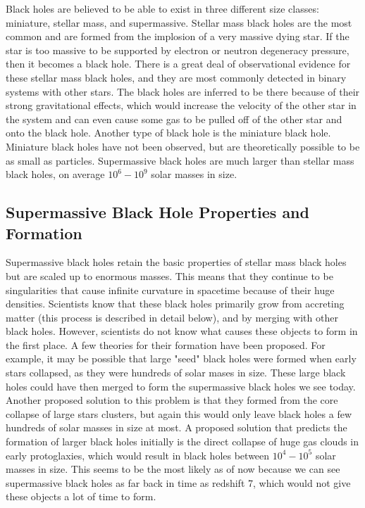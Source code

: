 \documentclass[12pt]{article}
\begin{document}
Black holes are believed to be able to exist in three different size classes:
miniature, stellar mass, and supermassive.  Stellar mass black holes are the
most common and are formed from the implosion of a very massive dying star.  If
the star is too massive to be supported by electron or neutron degeneracy
pressure, then it becomes a black hole.  There is a
great deal of observational evidence for these stellar mass black holes, and
they are most commonly detected in binary systems with other stars.  The black
holes are inferred to be there because of their strong gravitational effects,
which would increase the velocity of the other star in the system and can even
cause some gas to be pulled off of the other star and onto the black hole.
Another type of black hole is the miniature black hole.  Miniature
black holes have not been observed, but are theoretically possible to be as
small as particles.  Supermassive black holes are much larger than stellar mass
black holes, on average $10^6 -10^9$ solar masses in size.

\subsection{Supermassive Black Hole Properties and Formation}
Supermassive black holes retain the basic properties of stellar mass black holes
but are scaled up to enormous masses.  This means that they continue to be
singularities that cause infinite curvature in spacetime because of their huge
densities.  Scientists know that these black holes primarily grow from accreting
matter (this process is described in detail below), and by merging with other
black holes.  However, scientists do not know what causes these objects to form
in the first place.  A few theories for their formation have been proposed.  For
example, it may be possible that large "seed" black holes were formed when early
stars collapsed, as they were hundreds of solar mases in size.  These large
black holes could have then merged to form the supermassive black holes we see
today.  Another proposed solution to this problem is that they formed from the
core collapse of large stars clusters, but again this would only leave black
holes a few hundreds of solar masses in size at most.  A proposed solution that
predicts the formation of larger black holes initially is the direct collapse of
huge gas clouds in early protoglaxies, which would result in black holes between
$10^4 - 10^5$ solar masses in size.  This seems to be the most likely as of now
because we can see supermassive black holes as far back in time as redshift 7,
which would not give these objects a lot of time to form.
\end{document}
